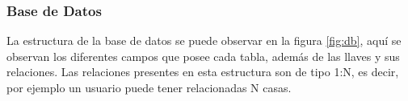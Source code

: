 \begin{frame}
\subsubsection{Base de Datos}

La estructura de la base de datos se puede observar en la figura \ref{fig:db}, aquí se observan los diferentes campos que posee cada tabla, además de las llaves y sus relaciones. Las relaciones presentes en esta estructura son de tipo 1:N, es decir, por ejemplo un usuario puede tener relacionadas N casas.\\



%


\end{frame}
